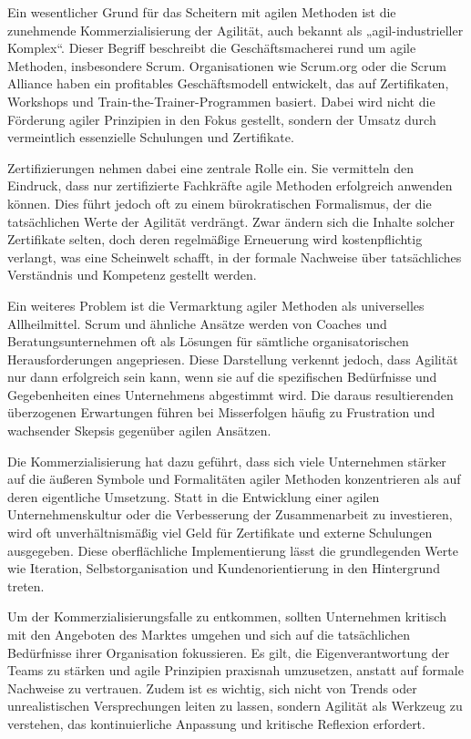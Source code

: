 \documentclass[ngerman]{seminarvorlage}
\begin{document}
Ein wesentlicher Grund für das Scheitern mit agilen Methoden ist die zunehmende Kommerzialisierung der Agilität, auch bekannt als „agil-industrieller Komplex“. Dieser Begriff beschreibt die Geschäftsmacherei rund um agile Methoden, insbesondere Scrum. Organisationen wie Scrum.org oder die Scrum Alliance haben ein profitables Geschäftsmodell entwickelt, das auf Zertifikaten, Workshops und Train-the-Trainer-Programmen basiert. Dabei wird nicht die Förderung agiler Prinzipien in den Fokus gestellt, sondern der Umsatz durch vermeintlich essenzielle Schulungen und Zertifikate.

Zertifizierungen nehmen dabei eine zentrale Rolle ein. Sie vermitteln den Eindruck, dass nur zertifizierte Fachkräfte agile Methoden erfolgreich anwenden können. Dies führt jedoch oft zu einem bürokratischen Formalismus, der die tatsächlichen Werte der Agilität verdrängt. Zwar ändern sich die Inhalte solcher Zertifikate selten, doch deren regelmäßige Erneuerung wird kostenpflichtig verlangt, was eine Scheinwelt schafft, in der formale Nachweise über tatsächliches Verständnis und Kompetenz gestellt werden.

Ein weiteres Problem ist die Vermarktung agiler Methoden als universelles Allheilmittel. Scrum und ähnliche Ansätze werden von Coaches und Beratungsunternehmen oft als Lösungen für sämtliche organisatorischen Herausforderungen angepriesen. Diese Darstellung verkennt jedoch, dass Agilität nur dann erfolgreich sein kann, wenn sie auf die spezifischen Bedürfnisse und Gegebenheiten eines Unternehmens abgestimmt wird. Die daraus resultierenden überzogenen Erwartungen führen bei Misserfolgen häufig zu Frustration und wachsender Skepsis gegenüber agilen Ansätzen.

Die Kommerzialisierung hat dazu geführt, dass sich viele Unternehmen stärker auf die äußeren Symbole und Formalitäten agiler Methoden konzentrieren als auf deren eigentliche Umsetzung. Statt in die Entwicklung einer agilen Unternehmenskultur oder die Verbesserung der Zusammenarbeit zu investieren, wird oft unverhältnismäßig viel Geld für Zertifikate und externe Schulungen ausgegeben. Diese oberflächliche Implementierung lässt die grundlegenden Werte wie Iteration, Selbstorganisation und Kundenorientierung in den Hintergrund treten.

Um der Kommerzialisierungsfalle zu entkommen, sollten Unternehmen kritisch mit den Angeboten des Marktes umgehen und sich auf die tatsächlichen Bedürfnisse ihrer Organisation fokussieren. Es gilt, die Eigenverantwortung der Teams zu stärken und agile Prinzipien praxisnah umzusetzen, anstatt auf formale Nachweise zu vertrauen. Zudem ist es wichtig, sich nicht von Trends oder unrealistischen Versprechungen leiten zu lassen, sondern Agilität als Werkzeug zu verstehen, das kontinuierliche Anpassung und kritische Reflexion erfordert.
\end{document}
